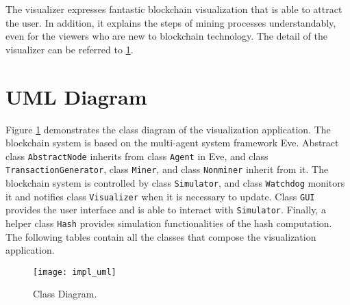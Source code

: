 The visualizer expresses fantastic blockchain visualization that is able to attract the user. In addition, it explains the steps of mining processes understandably, even for the viewers who are new to blockchain technology. The detail of the visualizer can be referred to \ref{sec:uml diagram}.

\section{UML Diagram}
\label{sec:uml diagram}

Figure \ref{fig:class diagram} demonstrates the class diagram of the visualization application. The blockchain system is based on the multi-agent system framework Eve. Abstract class \texttt{AbstractNode} inherits from class \texttt{Agent} in Eve, and class \texttt{TransactionGenerator}, class \texttt{Miner}, and class \texttt{Nonminer} inherit from it. The blockchain system is controlled by class \texttt{Simulator}, and class \texttt{Watchdog} monitors it and notifies class \texttt{Visualizer} when it is necessary to update. Class \texttt{GUI} provides the user interface and is able to interact with \texttt{Simulator}. Finally, a helper class \texttt{Hash} provides simulation functionalities of the hash computation. The following tables contain all the classes that compose the visualization application.

\clearpage

\vspace*{\fill}
\begin{figure}[!ht]
    \centering
    \texttt{[image: impl\_uml]}
    \caption{Class Diagram.}
    \label{fig:class diagram}
\end{figure}
\vspace*{\fill}

\clearpage

